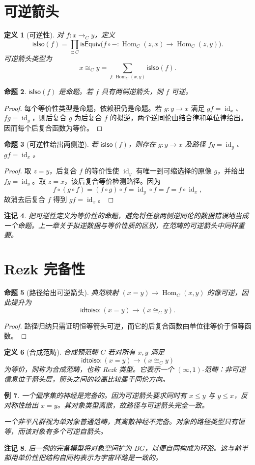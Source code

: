 \documentclass[12pt,oneside,openany,fontset=none]{ctexbook}
\theoremstyle{cn}
\newtheorem{definition}{定义}[chapter]
\newtheorem{example}[definition]{例}
\newtheorem{proposition}[definition]{命题}
\newtheorem{remark}[definition]{注记}
\numberwithin{equation}{chapter}
\newcommand{\id}{\operatorname{id}}
\newcommand{\Hom}{\operatorname{Hom}}
\newcommand{\isEquiv}{\mathsf{isEquiv}}
\newcommand{\isIso}{\mathsf{isIso}}
\newcommand{\idtoiso}{\mathsf{idtoiso}}
\begin{document}
\section{可逆箭头}
\begin{definition}[可逆性]
对 $f:x\to_Cy$，定义
\[
\isIso(f)=\prod_{z:C}\isEquiv
\bigl(f\circ-:\Hom_C(z,x)\to\Hom_C(z,y)\bigr).
\]
可逆箭头类型为
\[
x\cong_Cy=\sum_{f:\Hom_C(x,y)}\isIso(f).
\]
\end{definition}
\begin{proposition}
$\isIso(f)$ 是命题。若 $f$ 具有两侧逆箭头，则 $f$ 可逆。
\end{proposition}
\begin{proof}
每个等价性类型是命题，依赖积仍是命题。若 $g:y\to x$ 满足 $gf=\id_x$、$fg=\id_y$，则后复合 $g$ 为后复合 $f$ 的拟逆，两个逆同伦由结合律和单位律给出。因而每个后复合函数为等价。
\end{proof}
\begin{proposition}[可逆性给出两侧逆]
若 $\isIso(f)$，则存在 $g:y\to x$ 及路径 $fg=\id_y$、$gf=\id_x$。
\end{proposition}
\begin{proof}
取 $z=y$，后复合 $f$ 的等价性使 $\id_y$ 有唯一到可缩选择的原像 $g$，并给出 $fg=\id_y$。取 $z=x$，该后复合等价检测路径。因为
\[
f\circ(g\circ f)=(f\circ g)\circ f
=\id_y\circ f=f=f\circ\id_x,
\]
故消去后复合 $f$ 得到 $gf=\id_x$。
\end{proof}
\begin{remark}
把可逆性定义为等价性的命题，避免将任意两侧逆同伦的数据错误地当成一个命题。上一章关于拟逆数据与等价性质的区别，在范畴的可逆箭头中同样重要。
\end{remark}

\section{Rezk 完备性}
\begin{proposition}[路径给出可逆箭头]
典范映射 $(x=y)\to\Hom_C(x,y)$ 的像可逆，因此提升为
\[
\idtoiso:(x=y)\to(x\cong_Cy).
\]
\end{proposition}
\begin{proof}
路径归纳只需证明恒等箭头可逆，而它的后复合函数由单位律等价于恒等函数。
\end{proof}
\begin{definition}[合成范畴]\label{def:rezk}
合成预范畴 $C$ 若对所有 $x,y$ 满足
\[
\idtoiso:(x=y)\longrightarrow(x\cong_Cy)
\]
为等价，则称为合成范畴，也称 Rezk 类型。它表示一个 $(\infty,1)$-范畴：非可逆信息位于箭头层，箭头之间的较高比较属于同伦方向。
\end{definition}
\begin{example}
一个偏序集的神经是完备的。因为可逆箭头要求同时有 $x\le y$ 与 $y\le x$，反对称性给出 $x=y$。其对象类型离散，故路径与可逆箭头完全一致。

一个非平凡群视为单对象普通范畴，其离散神经不完备。对象的路径类型只有恒等，而该对象有多个可逆自箭头。
\end{example}
\begin{remark}
后一例的完备模型将对象空间扩为 $BG$，以便自同构成为环路。这与前半部用单价性把结构自同构表示为宇宙环路是一致的。
\end{remark}
\end{document}
